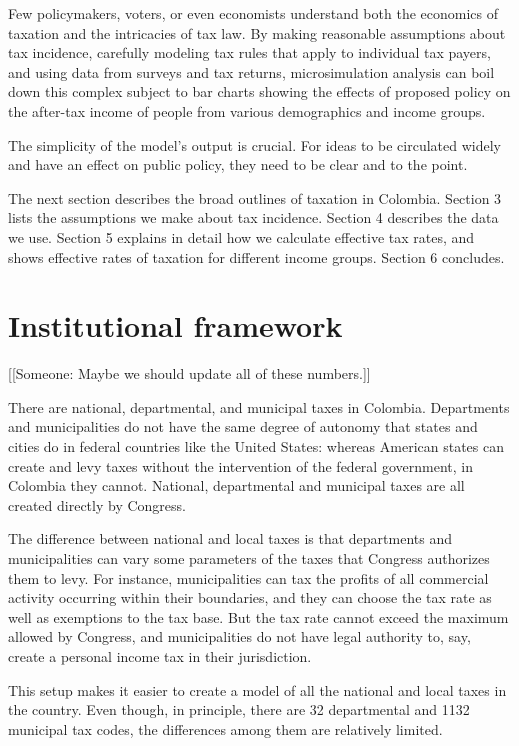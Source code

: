 \documentclass[12pt]{article}
\begin{document}
Few policymakers, voters, or even economists understand both
the economics of taxation
and the intricacies of tax law.
By making reasonable assumptions about tax incidence,
carefully modeling tax rules that apply to individual tax payers,
and using data from surveys and tax returns,
microsimulation analysis can boil down this complex subject to
bar charts showing the effects of proposed policy
on the after-tax income of people from various demographics and income groups.

The simplicity of the model's output is crucial.
For ideas to be circulated widely and have an effect on public policy,
they need to be clear and to the point.

The next section describes the broad outlines of taxation in Colombia.
Section 3 lists the assumptions we make about tax incidence.
Section 4 describes the data we use.
Section 5 explains in detail how we calculate effective tax rates,
and shows effective rates of taxation for different income groups.
Section 6 concludes.

\section{Institutional framework}

[[Someone:
    Maybe we should update all of these numbers.]]

There are national, departmental, and municipal taxes in Colombia.
Departments and municipalities do not have the same degree of autonomy
that states and cities do in federal countries like the United States:
whereas American states can create and levy taxes
without the intervention of the federal government,
in Colombia they cannot.
National, departmental and municipal taxes
are all created directly by Congress.

The difference between national and local taxes
is that departments and municipalities can vary
some parameters of the taxes that Congress authorizes them to levy.
For instance, municipalities can tax the profits of
all commercial activity occurring within their boundaries,
and they can choose the tax rate as well as exemptions to the tax base.
But the tax rate cannot exceed the maximum allowed by Congress,
and municipalities do not have legal authority to, say,
create a personal income tax in their jurisdiction.

This setup makes it easier to create a model
of all the national and local taxes in the country.
Even though, in principle,
there are 32 departmental and 1132 municipal tax codes,
the differences among them are relatively limited.
\end{document}
